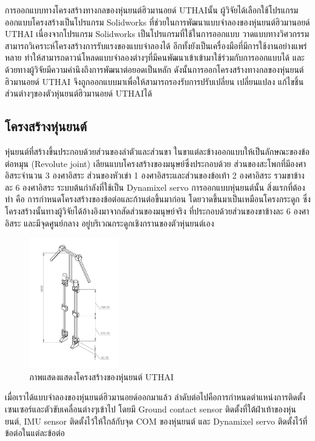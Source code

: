 การออกแบบทางโครงสร้างทางกลของหุ่นยนต์ฮิวมานอยด์ UTHAIนั้น ผู้วิจัยได้เลือกใช้โปรแกรมออกแบบโครงสร้างเป็นโปรแกรม Solidworks
ที่ช่วยในการพัฒนาแบบจำลองของหุ่นยนต์ฮิวมานอยด์ UTHAI
เนื่องจากโปรแกรม Solidworks เป็นโปรแกรมที่ใช้ในการออกแบบ วาดแบบทางวิศวกรรม
สามารถวิเคราะห์โครงสร้างการรับแรงของแบบจำลองได้ อีกทั้งยังเป็นเครื่องมือที่มีการใช้งานอย่างแพร่หลาย
ทำให้สามารถดาวน์โหลดแบบจำลองต่างๆที่มีคนพัฒนาเข้าเข้ามาใช้ร่วมกับการออกแบบได้ 
และด้วยทางผู้วิจัยมีความคำนึงถึงการพัฒนาต่อยอดเป็นหลัก ดังนั้นการออกโครงสร้างทางกลของหุ่นยนต์ฮิวมานอยด์ UTHAI
จึงถูกออกแบบมาเพื่อให้สามารถรองรับการปรับเปลี่ยน เปลี่ยนแปลง แก้ไขชิ้นส่วนต่างๆของตัวหุ่นยนต์ฮิวมานอยด์ UTHAIได้

\subsection{โครงสร้างหุ่นยนต์}
หุ่นยนต์ที่สร้างขึ้นประกอบด้วยส่วนของลำตัวและส่วนขา ในขาแต่ละข้างออกแบบให้เป็นลักษณะของข้อต่อหมุน (Revolute joint)
เลียนแบบโครงสร้างของมนุษย์ซึ่งประกอบด้วย ส่วนของสะโพกที่มีองศาอิสระจำนวน 3 องศาอิสระ ส่วนของหัวเข่า 1
องศาอิสระและส่วนของข้อเท้า 2 องศาอิสระ รวมขาข้างละ 6 องศาอิสระ ระบบต้นกำลังที่ใช้เป็น Dynamixel servo การออกแบบหุ่นยนต์นั้น
สิ่งแรกที่ต้องทำ คือ การกำหนดโครงสร้างของข้อต่อและก้านต่อขึ้นมาก่อน โดยวาดขึ้นมาเป็นเหมือนโครงกระดูก
ซึ่งโครงสร้างนั้นทางผู้วิจัยได้อ้างอิงมาจากสัดส่วนของมนุษย์จริง ที่ประกอบด้วยส่วนของขาข้างละ 6 องศาอิสระ และมีจุดศูนย์กลาง
อยู่บริเวณกระดูกเชิงกรานของตัวหุ่นยนต์เอง
\begin{figure}[!ht]
    \centering
    \includegraphics[width=0.35\textwidth]{chapter3/images/uthai_structure1.png}
    \caption{ภาพแสดงแสดงโครงสร้างของหุ่นยนต์ UTHAI}
    \label{fig:uthai_structure1}
\end{figure}

เมื่อเราได้แบบจำลองของหุ่นยนต์ฮิวมานอยด์ออกมาแล้ว ลำดับต่อไปคือการกำหนดตำแหน่งการติดตั้งเซนเซอร์และตัวขับเคลื่อนต่างๆเข้าไป
โดยมี Ground contact sensor ติดตั้งที่ใต้ฝ่าเท้าของหุ่นยนต์, IMU sensor ติดตั้งไว้ให้ใกล้กับจุด COM ของหุ่นยนต์ และ Dynamixel servo
ติดตั้งไว้ที่ข้อต่อในแต่ละข้อต่อ

